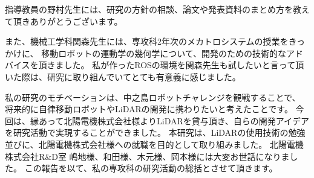 \documentclass[a4paper,12pt]{jreport}
\begin{document}
指導教員の野村先生には、研究の方針の相談、論文や発表資料のまとめ方を教えて頂きありがとうございます。

また、機械工学科関森先生には、専攻科2年次のメカトロシステムの授業をきっかけに、
移動ロボットの運動学の幾何学について、開発のための技術的なアドバイスを頂きました。
私が作ったROSの環境を関森先生も試したいと言って頂いた際は、研究に取り組んでいてとても有意義に感じました。

私の研究のモチベーションは、中之島ロボットチャレンジを観戦することで、
将来的に自律移動ロボットやLiDARの開発に携わりたいと考えたことです。
今回は、縁あって北陽電機株式会社様よりLiDARを貸与頂き、自らの開発アイデアを研究活動で実現することができました。
本研究は、LiDARの使用技術の勉強並びに、北陽電機株式会社様への就職を目的として取り組みました。
北陽電機株式会社R\&D室 嶋地様、和田様、木元様、岡本様には大変お世話になりました。
この報告を以て、私の専攻科の研究活動の総括とさせて頂きます。


\end{document}
